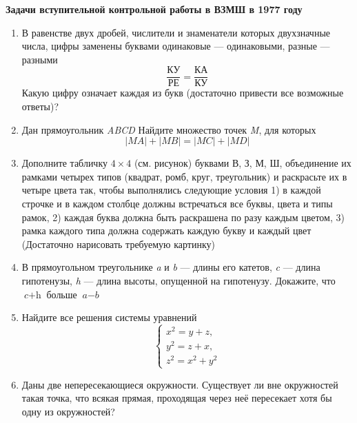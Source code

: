 \raggedcolumns %

\begin{multicols}{2} %
\noindent \textbf{\LARGE Задачи вступительной контрольной работы в ВЗМШ в 1977 году} \\

\begin{enumerate}[itemsep=0pt, wide=0pt, itemindent=3em] %
\item В равенстве двух дробей, числители и знаменатели которых двухзначные числа, цифры заменены буквами одинаковые --- одинаковыми, разные --- разными
\[\frac{\textit{КУ}}{\textit{РЕ}} = \frac{\textit{КА}}{\textit{КУ}}\]
\hspace* {3mm} Какую цифру означает каждая из букв (достаточно привести все возможные ответы)?\setlength{\parindent}{1.5em}
\item Дан прямоугольник \textit{ABCD} Найдите множество точек \textit{M}, для которых
\[|\textit{MA}|+|\textit{MB}| = |\textit{MC}| + |\textit{MD}|\]
\item Дополните табличку $4\times4$ (см. рисунок) буквами В, З, М, Ш, объединение их рамками четырех типов (квадрат, ромб, круг, треугольник) и раскрасьте их в четыре цвета так, чтобы выполнялись следующие условия 1) в каждой строчке и в каждом столбце должны встречаться все буквы, цвета и типы рамок, 2) каждая буква должна быть раскрашена по разу каждым цветом, 3) рамка каждого типа должна содержать каждую букву и каждый цвет (Достаточно нарисовать требуемую картинку)
\item В прямоугольном треугольнике \textit{a} и \textit{b} --- длины его катетов, \textit{c} --- длина гипотенузы, \textit{h} --- длина высоты, опущенной на гипотенузу. Докажите, что $\textit{c} + \textit{h}$ больше $\textit{a} - \textit{b}$
\item Найдите все решения системы уравнений
\[
\begin{cases}
x^2 = y + z,\\
y^2 = z + x,\\
z^2 = x^2 + y^2
\end{cases}
\]
\item Даны две непересекающиеся окружности. Существует ли вне окружностей такая точка, что всякая прямая, проходящая через неё пересекает хотя бы одну из окружностей?\\

\end{enumerate}
\end{multicols}
